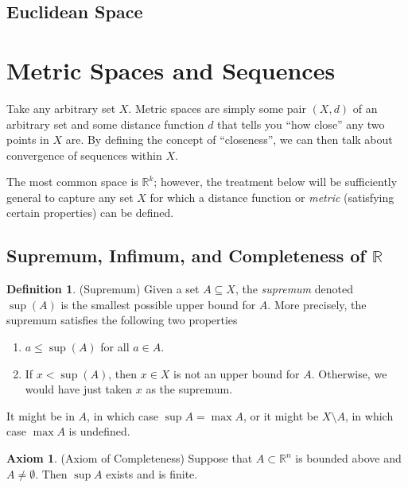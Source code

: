 \documentclass[12pt]{article}
\numberwithin{equation}{section} %
\theoremstyle{plain}
\theoremstyle{definition}
\newtheorem{ax}[thm]{Axiom}
\newtheorem{defn}[thm]{Definition}
\theoremstyle{remark}
\newcommand{\R}{\mathbb{R}}
\begin{document}
\clearpage
\subsection{Euclidean Space}



\clearpage
\section{Metric Spaces and Sequences}

Take any arbitrary set $X$. Metric spaces are simply some pair $(X,d)$
of an arbitrary set and some distance function $d$ that tells you ``how
close'' any two points in $X$ are. By defining the concept of
``closeness'', we can then talk about convergence of sequences within
$X$.

The most common space is $\R^k$; however, the treatment below
will be sufficiently general to capture any set $X$ for which a distance
function or \emph{metric} (satisfying certain properties) can be
defined.

\subsection{Supremum, Infimum, and Completeness of $\R$}


\begin{defn}{(Supremum)}
\label{defn:supdef1}
Given a set $A\subseteq X$, the \emph{supremum} denoted $\sup(A)$ is the
smallest possible upper bound for $A$.
More precisely, the supremum satisfies the following two properties
\begin{enumerate}
  \item $a\leq \sup(A)$ for all $a\in A$.
  \item If $x<\sup(A)$, then $x\in X$ is not an upper bound for $A$.
    Otherwise, we would have just taken $x$ as the supremum.
\end{enumerate}
It might be in $A$, in which case $\sup A = \max A$, or it might be
$X\setminus A$, in which case $\max A$ is undefined.
\end{defn}

\begin{ax}{(Axiom of Completeness)}
\label{ax:completeness}
Suppose that $A\subset \R^n$ is bounded above and $A\neq
\emptyset$. Then $\sup A$ exists and is finite.
\end{ax}
\end{document}
